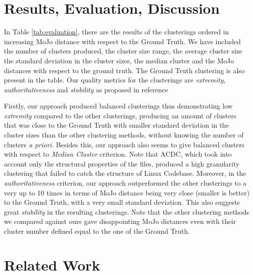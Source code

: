 \documentclass[sigconf,review, anonymous]{acmart}
\begin{document}
\section{Results, Evaluation, Discussion}

 In Table \ref{tab:evaluation}, there are the results of the clusterings ordered in increasing MoJo distance with respect to the Ground Truth. We have included the number of clusters produced, the cluster size range, the average cluster size the standard deviation in the cluster sizes, the median cluster and the MoJo distances with respect to the ground truth. The Ground Truth clustering is also present in the table. Our quality metrics for the clusterings are 
\emph{extremity}, \emph{authoritativeness} and \emph{stability} as proposed in reference \cite{evaluation}

Firstly, our approach produced balanced clusterings thus demonstrating low \emph{extremity} compared to the other clusterings, producing an amount of clusters that was close to the Ground Truth with smaller standard deviation in the cluster sizes than the other clustering methods, without knowing the number of clusters \emph{a priori}. Besides this, our approach also seems to give balanced clusters with respect to \emph{Median Cluster} criterion. Note that ACDC, which took into account only the structural properties of the files, produced a high granularity clustering that failed to catch the structure of Linux Codebase. 
Moreover, in the \emph{authoritativeness} criterion, our approach outperformed the other clusterings to a very up to 10 times in terms of MoJo distance being very close (smaller is better) to the Ground Truth, with a very small standard deviation. This also suggests great
\emph{stability} in the resulting clusterings. Note that the other clustering methods we compared against ours gave disappointing MoJo distances even with their cluster number defined 
equal to the one of the Ground Truth. 


\section{Related Work}


\end{document}
